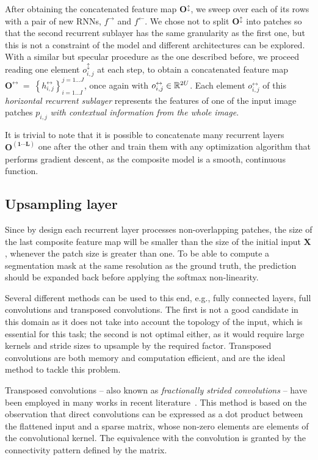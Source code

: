 After obtaining the concatenated feature map $\mathbf{O^{\updownarrow}}$, we
sweep over each of its rows with a pair of new RNNs, $f^{\rightarrow}$ and
$f^{\leftarrow}$. We chose not to split $\mathbf{O^{\updownarrow}}$ into
patches so that the second recurrent sublayer has the same granularity as the
first one, but this is not a constraint of the model and different
architectures can be explored.  With a similar but specular procedure as the
one described before, we proceed reading one element $o^\updownarrow_{i,j}$ at
each step, to obtain a concatenated feature map
$\mathbf{O^\leftrightarrow}~=~\left\{ h^\leftrightarrow_{i,j} \right\}
_{i=1\dots I}^{j=1\dots J}$, once again with $o^\leftrightarrow_{i,j} \in
\mathbb{R}^{2U}$. Each element $o^\leftrightarrow_{i,j}$ of this \emph{horizontal
recurrent sublayer} represents the features of one of the input image patches
$p_{i,j}$ \emph{with contextual information from the whole image}.

It is trivial to note that it is possible to concatenate many recurrent layers
$\mathbf{O^{(1 \cdots L)}}$ one after the other and train them with any
optimization algorithm that performs gradient descent, as the composite model
is a smooth, continuous function.

\subsection{Upsampling layer}\label{sec:upsampling}
Since by design each recurrent layer processes non-overlapping patches, the
size of the last composite feature map will be smaller than the size of the
initial input $\mathbf{X}$, whenever the patch size is greater than one. To be
able to compute a segmentation mask at the same resolution as the ground truth,
the prediction should be expanded back before applying the softmax non-linearity.

Several different methods can be used to this end, e.g., fully connected
layers, full convolutions and transposed convolutions. The first is not a good
candidate in this domain as it does not take into account the topology of the
input, which is essential for this task; the second is not optimal either, as
it would require large kernels and stride sizes to upsample by the
required factor. Transposed convolutions are both memory and
computation efficient, and are the ideal method to tackle this problem.

Transposed convolutions -- also known as \emph{fractionally strided
convolutions} -- have been employed in many works in recent
literature~\cite{Zeiler-ICCV2011,ZeilerFergus14,long2015fully,
radford2015unsupervised,im2016generating}. This method is based on the observation
that direct convolutions can be expressed as a dot product between the
flattened input and a sparse matrix, whose non-zero elements are elements of the
convolutional kernel. The equivalence with the convolution is granted by the
connectivity pattern defined by the matrix.

